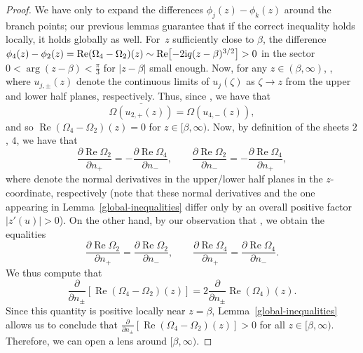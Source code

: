 \documentclass[10pt,a4paper]{amsart}
\numberwithin{equation}{section}
\begin{document}
 \begin{proof}
 We have only to expand the differences $\phi_j(z)-\phi_k(z)$ around the branch points; our previous lemmas guarantee that if the correct inequality holds locally, it holds globally as well.
 For~$z$ sufficiently close to $\beta$, the difference ${\phi_4(z) - \phi_2(z) = \operatorname{Re}(\Omega_4 - \Omega_2)(z) \sim \operatorname{Re}\bigl[-2{\rm i}q (z-\beta)^{3/2}\bigr] >0}$ in the sector $0< \arg (z-\beta) < \frac{\pi}{3}$ for $|z-\beta|$ small enough.
 Now, for any $z \in (\beta,\infty)$, , where $u_{j,\pm}(z)$ denote the continuous limits of $u_j(\zeta)$ as $\zeta \to z$ from the upper and lower half planes, respectively. Thus, since , we have that
 \begin{equation*}
 \overline{\Omega(u_{2,+}(z))} = \Omega(u_{4,-}(z)),
 \end{equation*}
 and so $\operatorname{Re}(\Omega_4 - \Omega_2)(z) = 0$ for $z\in [\beta,\infty)$. Now, by definition of the sheets $2$, $4$, we have that
 \begin{equation*}
 \frac{\partial \operatorname{Re}\Omega_2}{\partial n_+} = -\frac{\partial \operatorname{Re}\Omega_4}{\partial n_-},\qquad
 \frac{\partial \operatorname{Re}\Omega_2}{\partial n_-} = -\frac{\partial \operatorname{Re}\Omega_4}{\partial n_+},
 \end{equation*}
 where  denote the normal derivatives in the upper/lower half planes in the $z$-coordinate, respectively (note that these normal derivatives and the one appearing in Lemma~\ref{global-inequalities} differ only by an overall positive factor $|z'(u)| >0 $).
 On the other hand, by our observation that , we obtain the equalities
 \begin{equation*}
 \frac{\partial \operatorname{Re}\Omega_2}{\partial n_+} = \frac{\partial \operatorname{Re}\Omega_2}{\partial n_-},\qquad
 \frac{\partial \operatorname{Re}\Omega_4}{\partial n_+} = \frac{\partial \operatorname{Re}\Omega_4}{\partial n_-}.
 \end{equation*}
 We thus compute that
 \begin{equation*}
 \frac{\partial}{\partial n_{\pm}} [\operatorname{Re}(\Omega_4 - \Omega_2)(z)] = 2\frac{\partial}{\partial n_{\pm}}\operatorname{Re}(\Omega_4)(z).
 \end{equation*}
 Since this quantity is positive locally near $z=\beta$, Lemma~\ref{global-inequalities} allows us to conclude that \sloppy $\frac{\partial}{\partial n_{\pm}} [\operatorname{Re}(\Omega_4 - \Omega_2)(z)] >0$ for all $z \in [\beta,\infty)$.
 Therefore, we can open a lens around $[\beta,\infty)$.


\end{proof}
\end{document}
